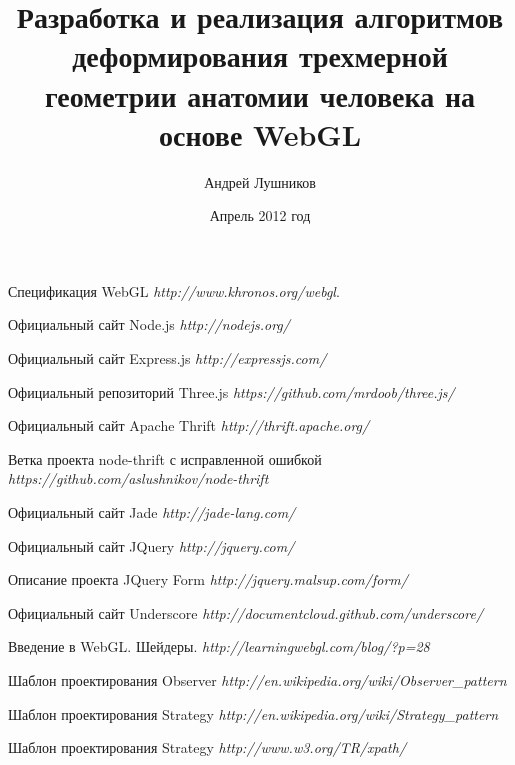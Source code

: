 \documentclass[14pt, a4paper]{extarticle}
\author{Андрей Лушников}
\title{Разработка и реализация алгоритмов деформирования трехмерной геометрии
анатомии человека на основе WebGL}
\date{Апрель 2012 год}
\begin{document}



\tableofcontents
\newpage

















\begin{thebibliography}{9}

  Спецификация WebGL
  \emph{http://www.khronos.org/webgl}.

  Официальный сайт Node.js
  \emph{http://nodejs.org/}

  Официальный сайт Express.js
  \emph{http://expressjs.com/}

  Официальный репозиторий Three.js
  \emph{https://github.com/mrdoob/three.js/}

  Официальный сайт Apache Thrift
  \emph{http://thrift.apache.org/}

  Ветка проекта node-thrift с исправленной ошибкой
  \emph{https://github.com/aslushnikov/node-thrift}

  Официальный сайт Jade
  \emph{http://jade-lang.com/}

  Официальный сайт JQuery
  \emph{http://jquery.com/}

  Описание проекта JQuery Form
  \emph{http://jquery.malsup.com/form/}

  Официальный сайт Underscore
  \emph{http://documentcloud.github.com/underscore/}

  Введение в WebGL. Шейдеры.
  \emph{http://learningwebgl.com/blog/?p=28}

  Шаблон проектирования Observer
  \emph{http://en.wikipedia.org/wiki/Observer\_pattern}

  Шаблон проектирования Strategy
  \emph{http://en.wikipedia.org/wiki/Strategy\_pattern}

  Шаблон проектирования Strategy
  \emph{http://www.w3.org/TR/xpath/}

\end{thebibliography}
\end{document}

